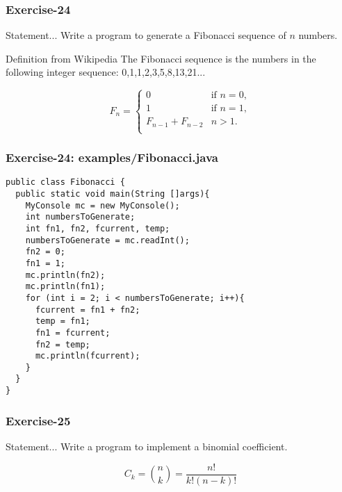 \documentclass[xcolor=dvipsnames,dvip,notes=show,table]{beamer}
\begin{document}
\begin{frame}[fragile]
\frametitle{Exercise-24}
\begin{block}{Statement...}
Write a program to generate a Fibonacci sequence of $n$ numbers.
\end{block}
% 
\begin{exampleblock}{Definition from Wikipedia}
The Fibonacci sequence is the numbers in the following integer sequence:
0,1,1,2,3,5,8,13,21...
\end{exampleblock}


\begin{equation}
F_n = \begin{cases}
0 & \text{if } n = 0, \\
1 & \text{if } n = 1, \\
F_{n-1} + F_{n-2} & n > 1.\\
\end{cases}
\end{equation}



\end{frame}


\begin{frame}[fragile]
\frametitle{Exercise-24: examples/Fibonacci.java}
\scriptsize
\begin{lstlisting}
public class Fibonacci {
  public static void main(String []args){
    MyConsole mc = new MyConsole();
    int numbersToGenerate;
    int fn1, fn2, fcurrent, temp;
    numbersToGenerate = mc.readInt();
    fn2 = 0;
    fn1 = 1;
    mc.println(fn2);
    mc.println(fn1);
    for (int i = 2; i < numbersToGenerate; i++){
      fcurrent = fn1 + fn2;
      temp = fn1;
      fn1 = fcurrent;
      fn2 = temp;
      mc.println(fcurrent);
    }
  }
}
\end{lstlisting}
\end{frame}


\begin{frame}[fragile]
\frametitle{Exercise-25}
\begin{block}{Statement...}
Write a program to implement a binomial coefficient.
\end{block}
% 

\begin{equation}
C_{k} = \binom{n}{k} = \frac{n!}{k!(n-k)!} 
\end{equation}

\end{frame}
\end{document}
